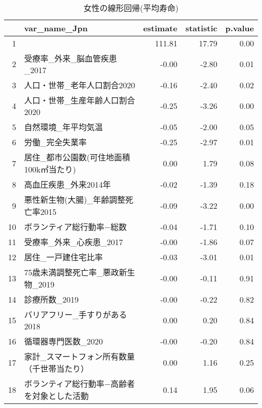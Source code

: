 \begin{table}[ht]
\centering
\begingroup\tiny
\begin{tabular}{rlrrr}
  \hline
 & var\_name\_Jpn & estimate & statistic & p.value \\ 
  \hline
1 &  & 111.81 & 17.79 & 0.00 \\ 
  2 & 受療率\_外来\_脳血管疾患\_2017 & -0.00 & -2.80 & 0.01 \\ 
  3 & 人口・世帯\_老年人口割合2020 & -0.16 & -2.40 & 0.02 \\ 
  4 & 人口・世帯\_生産年齢人口割合2020 & -0.25 & -3.26 & 0.00 \\ 
  5 & 自然環境\_年平均気温 & -0.05 & -2.00 & 0.05 \\ 
  6 & 労働\_完全失業率 & -0.25 & -2.97 & 0.01 \\ 
  7 & 居住\_都市公園数(可住地面積100k㎡当たり) & 0.00 & 1.79 & 0.08 \\ 
  8 & 高血圧疾患\_外来2014年 & -0.02 & -1.39 & 0.18 \\ 
  9 & 悪性新生物(大腸)\_年齢調整死亡率2015 & -0.09 & -3.22 & 0.00 \\ 
  10 & ボランティア総行動率−総数 & -0.04 & -1.71 & 0.10 \\ 
  11 & 受療率\_外来\_心疾患\_2017 & -0.00 & -1.86 & 0.07 \\ 
  12 & 居住\_一戸建住宅比率 & -0.03 & -3.01 & 0.01 \\ 
  13 & 75歳未満調整死亡率\_悪政新生物\_2019 & -0.00 & -0.11 & 0.91 \\ 
  14 & 診療所数\_2019 & -0.00 & -0.22 & 0.82 \\ 
  15 & バリアフリー\_手すりがある2018 & 0.00 & 0.20 & 0.84 \\ 
  16 & 循環器専門医数\_2020 & -0.00 & -0.20 & 0.84 \\ 
  17 & 家計\_スマートフォン所有数量（千世帯当たり） & 0.00 & 1.16 & 0.25 \\ 
  18 & ボランティア総行動率−高齢者を対象とした活動 & 0.14 & 1.95 & 0.06 \\ 
   \hline
\end{tabular}
\endgroup
\caption{女性の線形回帰(平均寿命)} 
\label{UsualLMLEf}
\end{table}
